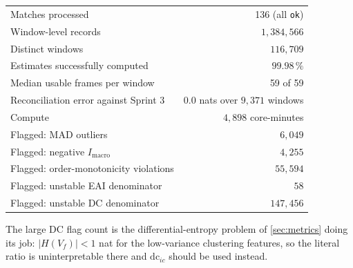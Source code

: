 \documentclass[11pt,a4paper]{article}
\newcommand{\code}[1]{\texttt{\small #1}}
\begin{document}
\begin{table}[H]
\centering
\small
\begin{tabular}{@{}lr@{}}
\toprule
Matches processed                      & 136 (all \code{ok}) \\
Window-level records                   & $1{,}384{,}566$ \\
Distinct windows                       & $116{,}709$ \\
Estimates successfully computed        & $99.98\,\%$ \\
Median usable frames per window        & 59 of 59 \\
Reconciliation error against Sprint 3  & $0.0$ nats over $9{,}371$ windows \\
Compute                                & $4{,}898$ core-minutes \\
\midrule
Flagged: MAD outliers                  & $6{,}049$ \\
Flagged: negative $I_{\text{macro}}$   & $4{,}255$ \\
Flagged: order-monotonicity violations & $55{,}594$ \\
Flagged: unstable EAI denominator      & $58$ \\
Flagged: unstable DC denominator       & $147{,}456$ \\
\bottomrule
\end{tabular}
\end{table}

The large DC flag count is the differential-entropy problem of \cref{sec:metrics} doing its
job: $|H(V_f)|<1$ nat for the low-variance clustering features, so the literal ratio is
uninterpretable there and $\mathrm{dc}_{ic}$ should be used instead.
\end{document}
